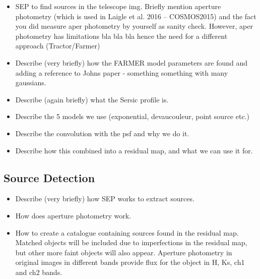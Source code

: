 \begin{itemize}
    \item SEP to find sources in the telescope img. Briefly mention aperture photometry (which is used in Laigle et al. 2016 -- COSMOS2015) and the fact you did measure aper photometry by yourself as sanity check. However, aper photometry has limitations bla bla bla hence the need for a different approach (Tractor/Farmer)
    \item Describe (very briefly) how the FARMER model parameters are found and adding a reference to Johns paper - something something with many gaussians. 
    \item Describe (again briefly) what the Sersic profile is.
    \item Describe the 5 models we use (exponential, devaucouleur, point source etc.)
    \item Describe the convolution with the psf and why we do it.
    \item Describe how this combined into a residual map, and what we can use it for.
\end{itemize}

\subsection{Source Detection}
\begin{itemize}
    \item Describe (very briefly) how SEP works to extract sources.
    \item How does aperture photometry work.
    \item How to create a catalogue containing sources found in the residual map. Matched objects will be included due to imperfections in the residual map, but other more faint objects will also appear. Aperture photometry in original images in different bands provide flux for the object in H, Ks, ch1 and ch2 bands.
\end{itemize}

